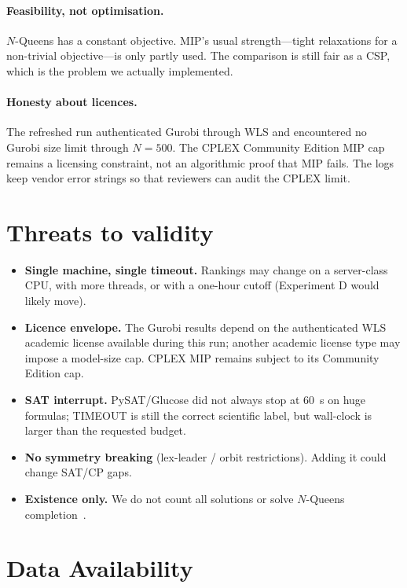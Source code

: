 \documentclass[a4paper,fleqn]{cas-sc}
\begin{document}
\paragraph{Feasibility, not optimisation.}
$N$-Queens has a constant objective.
MIP's usual strength---tight relaxations for a non-trivial objective---is only partly used.
The comparison is still fair as a CSP, which is the problem we actually implemented.

\paragraph{Honesty about licences.}
The refreshed run authenticated Gurobi through WLS and encountered no Gurobi size limit through $N=500$.
The CPLEX Community Edition MIP cap remains a licensing constraint, not an algorithmic proof that MIP fails.
The logs keep vendor error strings so that reviewers can audit the CPLEX limit.

\section{Threats to validity}
\label{sec:threats}

\begin{itemize}
    \item \textbf{Single machine, single timeout.} Rankings may change on a server-class CPU, with more threads, or with a one-hour cutoff (Experiment D would likely move).
    \item \textbf{Licence envelope.} The Gurobi results depend on the authenticated WLS academic license available during this run; another academic license type may impose a model-size cap. CPLEX MIP remains subject to its Community Edition cap.
    \item \textbf{SAT interrupt.} PySAT/Glucose did not always stop at 60~s on huge formulas; TIMEOUT is still the correct scientific label, but wall-clock is larger than the requested budget.
    \item \textbf{No symmetry breaking} (lex-leader / orbit restrictions). Adding it could change SAT/CP gaps.
    \item \textbf{Existence only.} We do not count all solutions or solve $N$-Queens completion~\cite{gent2017nqueens}.
\end{itemize}

\section{Data Availability}
\label{sec:data}
\end{document}
